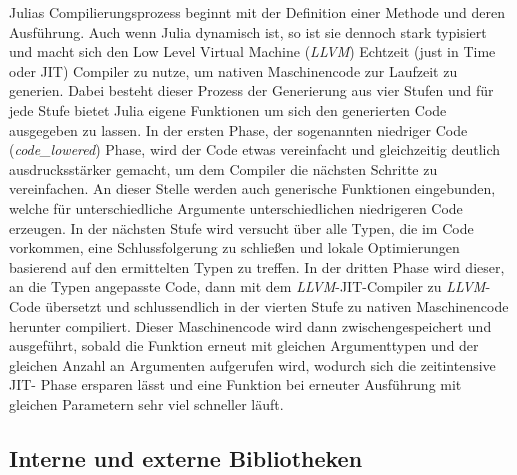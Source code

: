 \documentclass[proseminar,german,utf8]{zihpub}
\begin{document}
Julias Compilierungsprozess beginnt mit der Definition einer Methode und deren Ausführung. Auch wenn Julia dynamisch ist, so ist sie dennoch stark typisiert und macht sich den Low Level Virtual Machine (\textit{LLVM}) Echtzeit (just in Time oder JIT) Compiler zu nutze, um nativen Maschinencode zur Laufzeit zu generien. Dabei besteht dieser Prozess der Generierung aus vier Stufen und für jede Stufe bietet Julia eigene Funktionen um sich den generierten Code ausgegeben zu lassen. In der ersten Phase, der sogenannten niedriger Code (\textit{code\_lowered}) Phase, wird der Code etwas vereinfacht und gleichzeitig deutlich ausdrucksstärker gemacht, um dem Compiler die nächsten Schritte zu vereinfachen. An dieser Stelle werden auch generische Funktionen eingebunden, welche für unterschiedliche Argumente unterschiedlichen niedrigeren Code erzeugen. In der nächsten Stufe wird versucht über alle Typen, die im Code vorkommen, eine Schlussfolgerung zu schließen und lokale Optimierungen basierend auf den ermittelten Typen zu treffen. In der dritten Phase wird dieser, an die Typen angepasste Code, dann mit dem \textit{LLVM}-JIT-Compiler zu \textit{LLVM}-Code übersetzt  und schlussendlich in der vierten Stufe zu nativen Maschinencode herunter compiliert. Dieser Maschinencode wird dann zwischengespeichert und ausgeführt, sobald die Funktion erneut mit gleichen Argumenttypen und der gleichen Anzahl an Argumenten aufgerufen wird, wodurch sich die zeitintensive JIT- Phase ersparen lässt und eine Funktion bei erneuter Ausführung mit gleichen Parametern sehr viel schneller läuft.~\cite{JuliaLangDocumentation}~\cite{CompilerYoutube}~\cite{StaticJuliaComputing}

\subsection{Interne und externe Bibliotheken}
\end{document}
